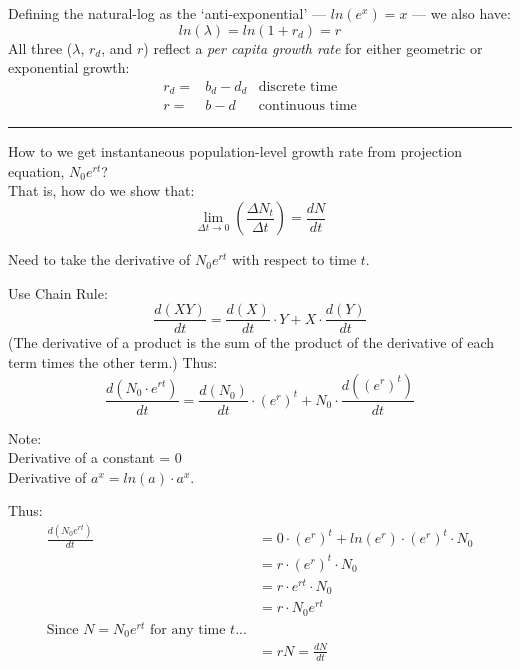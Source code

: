 \documentclass{article}
\newcommand*\circled[1]{\tikz[baseline=(char.base)]{
            \node[shape=circle,draw,inner sep=2pt] (char) {#1};}}
\begin{document}
Defining the natural-log as the `anti-exponential' --- $ln(e^x)=x$ --- we also have:
\begin{equation*}
	ln(\lambda)=ln(1+r_d)=r
\end{equation*}
All three ($\lambda$, $r_d$, and $r$) reflect a \emph{per capita growth rate} for either geometric or exponential growth:
\begin{align*}
	r_d= & b_d-d_d &\text{discrete time}\\
	r=& b-d & \text{continuous time}
\end{align*}

\rule[0.5ex]{\linewidth}{1pt}

\pagebreak

\circled{3}  How to we get instantaneous population-level growth rate from projection equation, $N_0 e^{rt}$?\\ That is, how do we show that:
\begin{equation*}
\lim_{\Delta t \to 0}\left(\frac{\Delta N_t}{\Delta t}\right) = \frac{dN}{dt}
\end{equation*}

Need to take the derivative of $N_0 e^{rt}$ with respect to time $t$.

Use Chain Rule:
\begin{equation*}
\frac{d(XY)}{dt}=\frac{d(X)}{dt}\cdot Y + X \cdot \frac{d(Y)}{dt}
\end{equation*}
(The derivative of a product is the sum of the product of the derivative of each term times the other term.)
Thus:
\begin{equation*}
\frac{d(N_0 \cdot e^{rt})}{dt}=\frac{d(N_0)}{dt}\cdot (e^r)^t + N_0 \cdot \frac{d((e^r)^t)}{dt}
\end{equation*}

Note:\\
Derivative of a constant = 0\\
Derivative of $a^x = ln(a)\cdot a^x$.

Thus:
\begin{align*}
	\frac{d(N_0 e ^{rt})}{dt} & =0 \cdot (e^r)^t + ln(e^r)\cdot (e^r)^t \cdot N_0\\
	&= r \cdot (e^r)^t \cdot N_0\\
	&= r \cdot e^{rt} \cdot N_0 \\
	&= r \cdot N_0 e^{rt} \\
\text{Since } N=N_0 e^{rt} \text{ for any time } t ...&\\
	&=rN=\frac{dN}{dt}
\end{align*}
\end{document}
